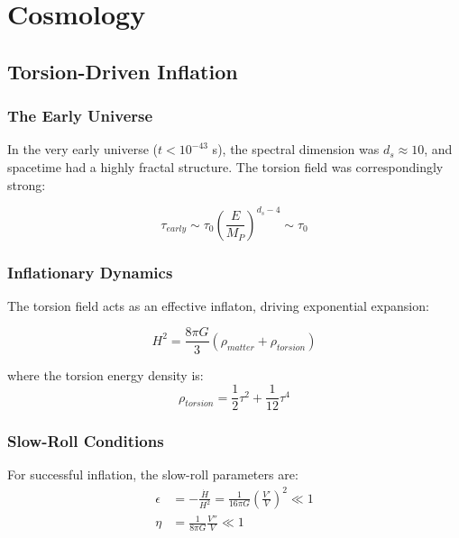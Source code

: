 \section{Cosmology}
\label{sec:cosmology}

\subsection{Torsion-Driven Inflation}

\subsubsection{The Early Universe}

In the very early universe ($t < 10^{-43}$ s), the spectral dimension was $d_s \approx 10$, and spacetime had a highly fractal structure. The torsion field was correspondingly strong:

\begin{equation}
    \tau_{early} \sim \tau_0 \left(\frac{E}{M_P}\right)^{d_s - 4} \sim \tau_0
\end{equation}

\subsubsection{Inflationary Dynamics}

The torsion field acts as an effective inflaton, driving exponential expansion:

\begin{equation}
    H^2 = \frac{8\pi G}{3}\left(\rho_{matter} + \rho_{torsion}\right)
\end{equation}

where the torsion energy density is:
\begin{equation}
    \rho_{torsion} = \frac{1}{2}\tau^2 + \frac{1}{12}\tau^4
\end{equation}

\subsubsection{Slow-Roll Conditions}

For successful inflation, the slow-roll parameters are:
\begin{align}
    \epsilon &= -\frac{\dot{H}}{H^2} = \frac{1}{16\pi G}\left(\frac{V'}{V}\right)^2 \ll 1 \\
    \eta &= \frac{1}{8\pi G}\frac{V''}{V} \ll 1
\end{align}

